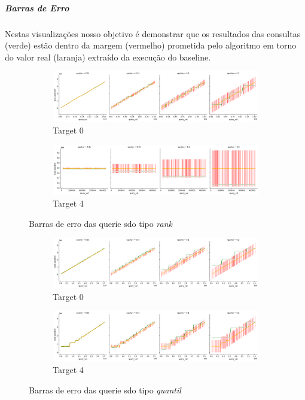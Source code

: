 \documentclass[11pt]{article}
\begin{document}
\subparagraph{Barras de Erro}

Nestas visualizações nosso objetivo é demonstrar que os resultados das consultas (verde) estão dentro da margem (vermelho) prometida pelo algoritmo em torno do valor real (laranja) extraído da execução do baseline.

\begin{figure}[H]
\begin{subfigure}{.5\textwidth}
  \centering
  \includegraphics[width=.9\linewidth]{../../img/RANK_erroplot_ecdf_RANK_t_0.png}
  \caption{Target 0}
  \label{fig:sub-first}
\end{subfigure}
\begin{subfigure}{.5\textwidth}
  \centering
  \includegraphics[width=.9\linewidth]{../../img/RANK_erroplot_ecdf_RANK_t_4.png}
  \caption{Target 4}
\end{subfigure}
\caption{Barras de erro das querie sdo tipo \emph{rank}}
\end{figure}

\begin{figure}[H]
\begin{subfigure}{.5\textwidth}
  \centering
  \includegraphics[width=.9\linewidth]{../../img/QUANTIL_erroplot_ecdf_QUANTIL_t_0.png}
  \caption{Target 0}
  \label{fig:sub-first}
\end{subfigure}
\begin{subfigure}{.5\textwidth}
  \centering
  \includegraphics[width=.9\linewidth]{../../img/QUANTIL_erroplot_ecdf_QUANTIL_t_4.png}
  \caption{Target 4}
\end{subfigure}
\caption{Barras de erro das querie sdo tipo \emph{quantil}}
\end{figure}
\end{document}
